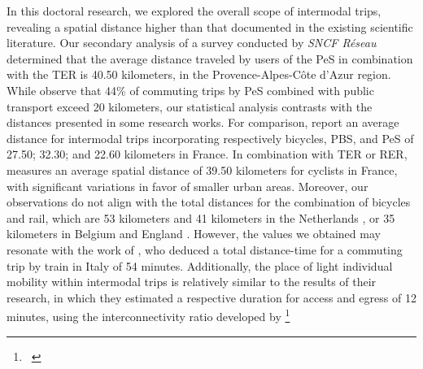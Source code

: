 \begin{refsegment}
In this doctoral research, we explored the overall scope of intermodal trips, revealing a spatial distance higher than that documented in the existing scientific literature. Our secondary analysis of a survey conducted by \textsl{SNCF Réseau} determined that the average distance traveled by users of the \acrshort{PeS} in combination with the \acrshort{TER} is 40.50 kilometers, in the Provence-Alpes-Côte d'Azur region. While \textcolor{blue}{\textcite[8]{edel_potential_2021}} observe that 44\% of commuting trips by \acrshort{PeS} combined with public transport exceed 20 kilometers, our statistical analysis contrasts with the distances presented in some research works. For comparison, \textcolor{blue}{\textcite[7]{rabaud_micromobilites_2019}} report an average distance for intermodal trips incorporating respectively bicycles, \acrshort{PBS}, and \acrshort{PeS} of 27.50; 32.30; and 22.60 kilometers in France. In combination with \acrshort{TER} or \acrshort{RER}, \textcolor{blue}{\textcite[16]{gioria_etude_2016}} measures an average spatial distance of 39.50 kilometers for cyclists in France, with significant variations in favor of smaller urban areas. Moreover, our observations do not align with the total distances for the combination of bicycles and rail, which are 53 kilometers and 41 kilometers in the Netherlands \textcolor{blue}{\autocites[14]{shelat_analysing_2018}[225]{keijer_how_2000}}, or 35 kilometers in Belgium and England \textcolor{blue}{\autocite[20 ; 28]{bitibi_bike_2017}}. However, the values we obtained may resonate with the work of \textcolor{blue}{\textcite[116]{nigro_land_2019}}, who deduced a total distance-time for a commuting trip by train in Italy of 54 minutes. Additionally, the place of light individual mobility within intermodal trips is relatively similar to the results of their research, in which they estimated a respective duration for access and egress of 12 minutes, using the interconnectivity ratio developed by \textcolor{blue}{\textcite[274]{krygsman_multimodal_2004}}\footnote{~
}
\end{refsegment}
